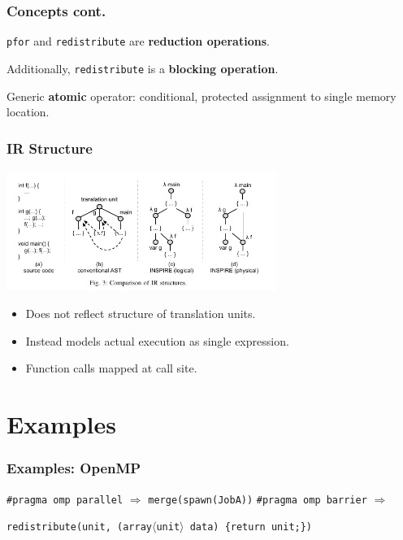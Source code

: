 \documentclass{beamer}
\newcommand\fB[1]{\textcolor{blue!80!black}{\textbf{#1}}}
\begin{document}
\begin{frame}
\frametitle{Concepts cont.}
\texttt{pfor} and \texttt{redistribute} are \fB{reduction operations}. 

Additionally, \texttt{redistribute} is a \fB{blocking operation}.
\bigskip

Generic \fB{atomic} operator: conditional, protected assignment to single memory location.
\end{frame}

\begin{frame}
\frametitle{IR Structure}

\begin{center}
\includegraphics[width=250pt]{structure}
\end{center}

\begin{itemize}
\item Does not reflect structure of translation units. 

\item Instead models actual execution as single expression. 

\item Function calls mapped at call site. 
\end{itemize}
\end{frame}

\section{Examples}
\begin{frame}
\frametitle{Examples: OpenMP}

\texttt{\#pragma omp parallel} $\Rightarrow$ \texttt{merge(spawn(JobA))}
\medskip
\newline\pause
\texttt{\#pragma omp barrier} $\Rightarrow$ 


\texttt{redistribute(unit, (array$\langle$unit$\rangle$ data) \{return unit;\})}
\end{frame}
\end{document}
